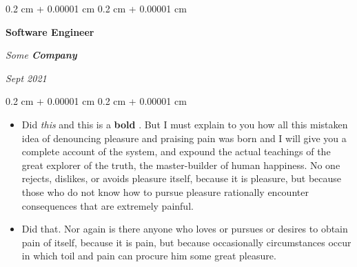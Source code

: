 \documentclass[10pt, letterpaper]{article}
\newenvironment{highlights}{
    \begin{itemize}[
        topsep=0.10 cm,
        parsep=0.10 cm,
        partopsep=0pt,
        itemsep=0pt,
        leftmargin=0.4 cm + 10pt
    ]
}{
    \end{itemize}
} %
\newenvironment{onecolentry}{
    \begin{adjustwidth}{
        0.2 cm + 0.00001 cm
    }{
        0.2 cm + 0.00001 cm
    }
}{
    \end{adjustwidth}
} %
\newenvironment{twocolentry}[2][]{
    \onecolentry
    \def\secondColumn{#2}
    \setcolumnwidth{\fill, 4.5 cm}
    \begin{paracol}{2}
}{
    \switchcolumn \raggedleft \secondColumn
    \end{paracol}
    \endonecolentry
} %
\let\hrefWithoutArrow\href
\renewcommand{\href}[2]{\hrefWithoutArrow{#1}{\ifthenelse{\equal{#2}{}}{ }{#2 }\raisebox{.15ex}{\footnotesize \faExternalLink*}}}
\begin{document}
        \vspace{0.2 cm}

        \begin{twocolentry}{
            
            
        \textit{Sept 2021}}
            \textbf{Software Engineer}
            
            \textit{Some \textbf{Company}}
        \end{twocolentry}
        \vspace{0.10 cm}
        \begin{onecolentry}
            \begin{highlights}
                \item Did \textit{this} and this is a \textbf{bold} \href{https://example.com}{link}. But I must explain to you how all this mistaken idea of denouncing pleasure and praising pain was born and I will give you a complete account of the system, and expound the actual teachings of the great explorer of the truth, the master-builder of human happiness. No one rejects, dislikes, or avoids pleasure itself, because it is pleasure, but because those who do not know how to pursue pleasure rationally encounter consequences that are extremely painful.
                \item Did that. Nor again is there anyone who loves or pursues or desires to obtain pain of itself, because it is pain, but because occasionally circumstances occur in which toil and pain can procure him some great pleasure.
            \end{highlights}
        \end{onecolentry}


        \vspace{0.2 cm}
\end{document}
